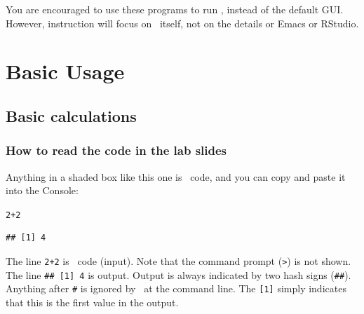 \documentclass[color=usenames,dvipsnames]{beamer}\usepackage[]{graphicx}\usepackage[]{color}
\makeatletter
\newcommand{\hlnum}[1]{\textcolor[rgb]{0.69,0.494,0}{#1}}%
\newcommand{\hlopt}[1]{\textcolor[rgb]{0,0,0}{#1}}%
\newenvironment{kframe}{%
 \def\at@end@of@kframe{}%
 \ifinner\ifhmode%
  \def\at@end@of@kframe{\end{minipage}}%
  \begin{minipage}{\columnwidth}%
 \fi\fi%
 \def\FrameCommand##1{\hskip\@totalleftmargin \hskip-\fboxsep
 \colorbox{shadecolor}{##1}\hskip-\fboxsep
     \hskip-\linewidth \hskip-\@totalleftmargin \hskip\columnwidth}%
 \MakeFramed {\advance\hsize-\width
   \@totalleftmargin\z@ \linewidth\hsize
   \@setminipage}}%
 {\par\unskip\endMakeFramed%
 \at@end@of@kframe}
\newenvironment{knitrout}{}{} %
\newcommand{\inr}[1]{\colorbox{inlinecolor}{\texttt{#1}}}
\makeatother
\begin{document}
\begin{frame}
\begin{columns}
\begin{column}{0.4\textwidth}
    \end{column}
  \end{columns}
  \small
  \vspace{0.5cm}
  You are encouraged to use these programs to run \R, instead of the default GUI. However, instruction will focus on \R~itself, not on the details or Emacs or RStudio. 
\end{frame}


\section{Basic Usage}





\subsection{Basic calculations}




\begin{frame}[fragile]
  \frametitle{How to read the code in the lab slides}
  Anything in a shaded box like this one is \R~code, and you can copy
  and paste it into the Console:  
\begin{knitrout}
\color{fgcolor}\begin{kframe}
\begin{alltt}
\hlnum{2}\hlopt{+}\hlnum{2}
\end{alltt}
\begin{verbatim}
## [1] 4
\end{verbatim}
\end{kframe}
\end{knitrout}
\pause %
  The line \inr{2+2} is \R~code (\alert{input}). Note that the command
  prompt (\verb+>+) is not shown.
\pause
\vfill
  The line \inr{\#\# [1] 4} is \alert{output}. Output is
  always indicated by two hash signs (\texttt{\#\#}). Anything after
  \texttt{\#} is ignored by \R~at the command line. The \inr{[1]}
  simply indicates that this is the first value in the output.
\end{frame}
\end{document}
